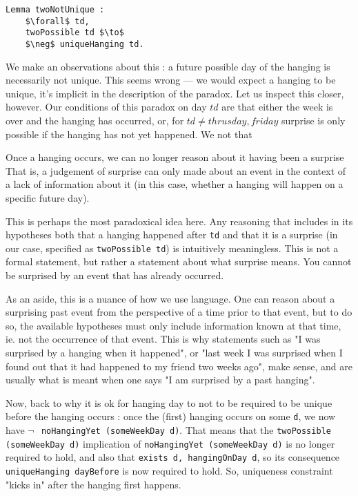\documentclass[journal]{journal}
\begin{document}
\begin{lstlisting}[mathescape=true]
  Lemma twoNotUnique :
    $\forall$ td,
    twoPossible td $\to$
    $\neg$ uniqueHanging td.
\end{lstlisting}

We make an observations about this : a future possible day of the hanging is
necessarily not unique. This seems wrong --- we would expect a hanging to be
unique, it's implicit in the
description of the paradox. Let us inspect this closer, however.
Our conditions of this paradox on day $td$ are that either
the week is over and the hanging has occurred, or, for $td \neq thrusday, friday$ surprise is
only possible if the hanging has not yet happened. We not that

Once a hanging occurs, we can no longer reason about it having been a surprise
That is, a judgement of surprise can only made about
an event in the context of a lack of information about it (in this case,
whether a hanging will happen on a specific future day).

This is perhaps the most paradoxical idea here. Any reasoning that includes
in its hypotheses both that a hanging happened after {\tt td} and that it is a surprise
(in our case, specified as {\tt twoPossible td}) is intuitively meaningless. This is not a
formal statement, but rather a statement about what surprise means. You cannot
be surprised by an event that has already occurred.

As an aside, this is a nuance of how we use language. One can reason about a surprising past
event from the perspective of a time prior to that event, but to do so,
the available hypotheses must only include information known at that time, ie.
not the occurrence of that event. This is why statements such as "I was surprised
by a hanging when it happened", or "last week I was surprised when I found out
that it had happened to my friend two weeks ago", make sense, and are usually
what is meant when one says "I am surprised by a past hanging".

Now, back to why it is ok for hanging day to not to be required to be unique
before the hanging occurs : once the (first) hanging
occurs on some {\tt d}, we now have {\tt $\neg~$ noHangingYet (someWeekDay d)}.
That means that the {\tt twoPossible (someWeekDay d)} implication of {\tt noHangingYet (someWeekDay d)}
is no longer required to hold, and also that {\tt exists d, hangingOnDay d}, so
its consequence {\tt uniqueHanging dayBefore} is now required to hold.
So, uniqueness constraint "kicks in" after the hanging first happens.
\end{document}

